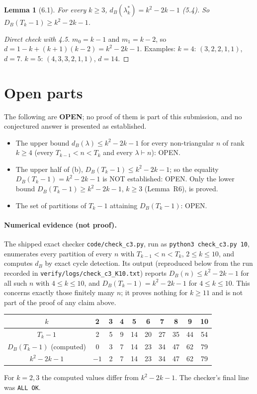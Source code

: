 \documentclass[11pt]{article}
\newtheorem{lemma}{Lemma}
\theoremstyle{remark}
\begin{document}
\begin{lemma}[6.1]\label{lem:R6}
For every $k\ge3$, $d_B(\lambda^*_k)=k^2-2k-1$ (5.4). So $D_B(T_k-1)\ge k^2-2k-1$.
\end{lemma}

\begin{proof}[Direct check with 4.5]
$m_0=k-1$ and $m_1=k-2$, so $d=1-k+(k+1)(k-2)=k^2-2k-1$. Examples: $k=4$: $(3,2,2,1,1)$, $d=7$. $k=5$:
$(4,3,3,2,1,1)$, $d=14$.
\end{proof}

\section*{Open parts}

The following are \textbf{OPEN}; no proof of them is part of this submission, and no conjectured answer is
presented as established.
\begin{itemize}
\item[(a)] The upper bound $d_B(\lambda)\le k^2-2k-1$ for every non-triangular $n$ of rank $k\ge4$ (every
$T_{k-1}<n<T_k$ and every $\lambda\vdash n$): OPEN.
\item[(b)] The upper half of (b), $D_B(T_k-1)\le k^2-2k-1$; so the equality $D_B(T_k-1)=k^2-2k-1$ is NOT
established: OPEN. Only the lower bound $D_B(T_k-1)\ge k^2-2k-1$, $k\ge3$ (Lemma~R6), is proved.
\item[(c)] The set of partitions of $T_k-1$ attaining $D_B(T_k-1)$: OPEN.
\end{itemize}

\paragraph{Numerical evidence (not proof).} The shipped exact checker \texttt{code/check\_c3.py}, run as
\texttt{python3 check\_c3.py 10}, enumerates every partition of every $n$ with $T_{k-1}<n<T_k$, $2\le k\le 10$, and
computes $d_B$ by exact cycle detection. Its output (reproduced below from the run recorded in
\texttt{verify/logs/check\_c3\_K10.txt}) reports $D_B(n)\le k^2-2k-1$ for all such $n$ with $4\le k\le 10$, and
$D_B(T_k-1)=k^2-2k-1$ for $4\le k\le 10$. This concerns exactly those finitely many $n$; it proves nothing for
$k\ge 11$ and is not part of the proof of any claim above.

\begin{center}
\begin{tabular}{c|ccccccccc}
$k$ & 2 & 3 & 4 & 5 & 6 & 7 & 8 & 9 & 10\\ \hline
$T_k-1$ & 2 & 5 & 9 & 14 & 20 & 27 & 35 & 44 & 54\\
$D_B(T_k-1)$ (computed) & 0 & 3 & 7 & 14 & 23 & 34 & 47 & 62 & 79\\
$k^2-2k-1$ & $-1$ & 2 & 7 & 14 & 23 & 34 & 47 & 62 & 79
\end{tabular}
\end{center}
For $k=2,3$ the computed values differ from $k^2-2k-1$. The checker's final line was \texttt{ALL OK}.
\end{document}
